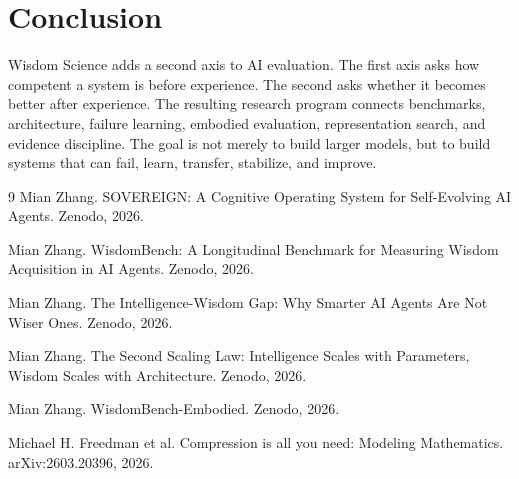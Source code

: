 \documentclass[11pt]{article}
\begin{document}
\section{Conclusion}

Wisdom Science adds a second axis to AI evaluation.
The first axis asks how competent a system is before experience.
The second asks whether it becomes better after experience.
The resulting research program connects benchmarks, architecture, failure learning, embodied evaluation, representation search, and evidence discipline.
The goal is not merely to build larger models, but to build systems that can fail, learn, transfer, stabilize, and improve.

\begin{thebibliography}{9}
Mian Zhang.
\newblock SOVEREIGN: A Cognitive Operating System for Self-Evolving AI Agents.
\newblock Zenodo, 2026.

Mian Zhang.
\newblock WisdomBench: A Longitudinal Benchmark for Measuring Wisdom Acquisition in AI Agents.
\newblock Zenodo, 2026.

Mian Zhang.
\newblock The Intelligence-Wisdom Gap: Why Smarter AI Agents Are Not Wiser Ones.
\newblock Zenodo, 2026.

Mian Zhang.
\newblock The Second Scaling Law: Intelligence Scales with Parameters, Wisdom Scales with Architecture.
\newblock Zenodo, 2026.

Mian Zhang.
\newblock WisdomBench-Embodied.
\newblock Zenodo, 2026.

Michael H. Freedman et al.
\newblock Compression is all you need: Modeling Mathematics.
\newblock arXiv:2603.20396, 2026.
\end{thebibliography}
\end{document}
